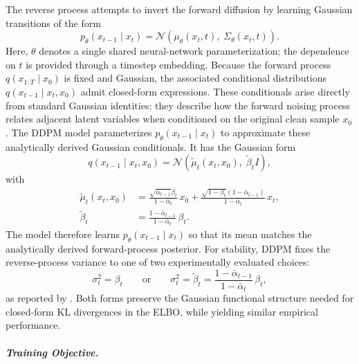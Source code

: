 The reverse process attempts to invert the forward diffusion by learning Gaussian transitions of the
form
\begin{equation}
    p_\theta(x_{t-1}\mid x_t)
    =
    \mathcal{N}\!\left(
        \mu_\theta(x_t,t),\;
        \Sigma_\theta(x_t,t)
    \right).
    \label{eq:ddpm_reverse}
\end{equation}
Here, \(\theta\) denotes a single shared neural-network parameterization; the dependence on \(t\) is
provided through a timestep embedding. Because the forward process \(q(x_{1:T}\mid x_0)\) is fixed and Gaussian, the
associated conditional distributions \(q(x_{t-1}\mid x_t,x_0)\) admit
closed-form expressions. These conditionals arise directly from standard Gaussian identities:
they describe how the forward noising process relates adjacent latent variables when conditioned
on the original clean sample \(x_0\). The DDPM model parameterizes
\(p_\theta(x_{t-1}\mid x_t)\) to approximate these analytically derived
Gaussian conditionals.
It has the Gaussian form
\begin{equation}
    q(x_{t-1}\mid x_t,x_0)
    =
    \mathcal{N}\!\left(
        \tilde{\mu}_t(x_t,x_0),\;
        \tilde{\beta}_t I
    \right),
    \label{eq:true_reverse_posterior}
\end{equation}
with
\begin{align}
    \tilde{\mu}_t(x_t,x_0)
    &=
    \frac{\sqrt{\bar\alpha_{t-1}}\beta_t}{1-\bar\alpha_t}\,x_0
    +
    \frac{\sqrt{1-\beta_t}(1-\bar\alpha_{t-1})}{1-\bar\alpha_t}\,x_t,
    \\
    \tilde{\beta}_t
    &=
    \frac{1-\bar\alpha_{t-1}}{1-\bar\alpha_t}\,\beta_t.
\end{align}
The model therefore learns \(p_\theta(x_{t-1}\mid x_t)\) so that its mean matches
the analytically derived forward-process posterior. For stability, DDPM fixes the reverse-process
variance to one of two experimentally evaluated choices:
\[
    \sigma_t^2 = \beta_t
    \qquad\text{or}\qquad
    \sigma_t^2 = \tilde{\beta}_t = \frac{1-\bar{\alpha}_{t-1}}{1-\bar{\alpha}_t}\,\beta_t,
\]
as reported by \citet{NEURIPS2020_4c5bcfec}. Both forms preserve the Gaussian functional structure
needed for closed-form KL divergences in the ELBO, while yielding similar empirical performance.

\subparagraph{Training Objective.}

